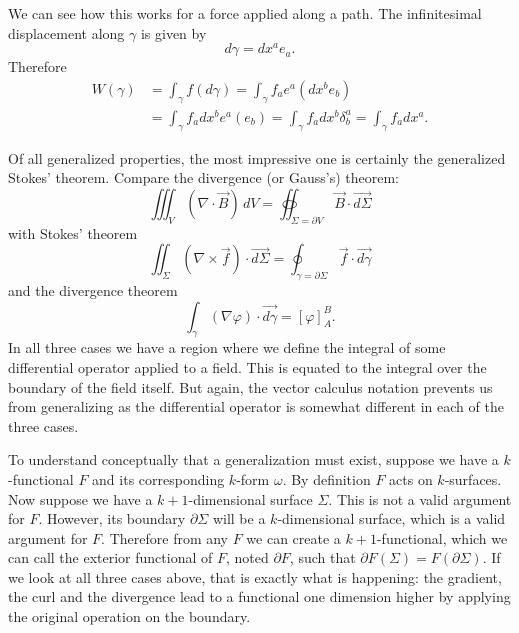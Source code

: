 \documentclass[10pt,twocolumn, nofootinbib]{revtex4-2}
\begin{document}
We can see how this works for a force applied along a path. The infinitesimal displacement along $\gamma$ is given by
\begin{equation*}
	d\gamma = dx^a e_a.
\end{equation*}
Therefore 
\begin{equation*}
	\begin{aligned}
		W(\gamma) &= \int_\gamma f(d\gamma) = \int_\gamma  f_a e^a(dx^b e_b) \\
		&= \int_\gamma  f_a dx^b e^a( e_b)
		= \int_\gamma  f_a dx^b \delta^a_b
		= \int_\gamma  f_a dx^a.
	\end{aligned}
\end{equation*}

Of all generalized properties, the most impressive one is certainly the generalized Stokes' theorem. Compare the divergence (or Gauss's) theorem:
\begin{equation*}
	\iiint_V (\nabla \cdot \vec{B}) \, dV = \oiint_{\Sigma = \partial V} \vec{B} \cdot \vec{d\Sigma}
\end{equation*}
with Stokes' theorem
\begin{equation*}
	\iint_\Sigma (\nabla \times \vec{f}) \cdot \vec{d\Sigma} = \oint_{\gamma = \partial \Sigma} \vec{f} \cdot \vec{d\gamma}
\end{equation*}
and the divergence theorem
\begin{equation*}
	\int_\gamma (\nabla \varphi) \cdot \vec{d\gamma} = \left[ \varphi \right]_A^B .
\end{equation*}
In all three cases we have a region where we define the integral of some differential operator applied to a field. This is equated to the integral over the boundary of the field itself. But again, the vector calculus notation prevents us from generalizing as the differential operator is somewhat different in each of the three cases.

To understand conceptually that a generalization must exist, suppose we have a $k$-functional $F$ and its corresponding $k$-form $\omega$. By definition $F$ acts on $k$-surfaces. Now suppose we have a $k+1$-dimensional surface $\Sigma$. This is not a valid argument for $F$. However, its boundary $\partial \Sigma$ will be a $k$-dimensional surface, which is a valid argument for $F$. Therefore from any $F$ we can create a $k+1$-functional, which we can call the exterior functional of $F$, noted $\partial F$, such that $\partial F(\Sigma) = F(\partial \Sigma)$. If we look at all three cases above, that is exactly what is happening: the gradient, the curl and the divergence lead to a functional one dimension higher by applying the original operation on the boundary.
\end{document}
